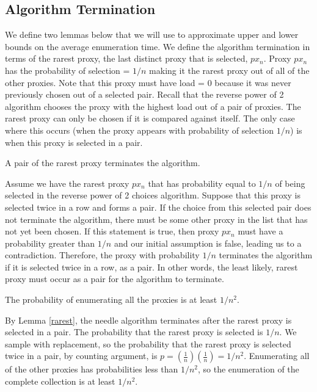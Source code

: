 \subsection{Algorithm Termination}

We define two lemmas below that we will use to approximate upper and lower bounds on the average enumeration time. We define the algorithm termination in terms of the rarest proxy, the last distinct proxy that is selected, $px_n$. Proxy $px_n$ has the probability of selection = $1/n$ making it the rarest proxy out of all of the other proxies. Note that this proxy must have load = 0 because it was never previously chosen out of a selected pair. Recall that the reverse power of 2 algorithm chooses the proxy with the highest load out of a pair of proxies. The rarest proxy can only be chosen if it is compared against itself. The only case where this occurs (when the proxy appears with probability of selection $1/n$) is when this proxy is selected in a pair. 

\begin{lemma}{A pair of the rarest proxy terminates the algorithm.}
\label{rarest}

Assume we have the rarest proxy \textbf{$px_n$} that has probability equal to $1/n$ of being selected in the reverse power of 2 choices algorithm. Suppose that this proxy is selected twice in a row and forms a pair. If the choice from this selected pair does not terminate the algorithm, there must be some other proxy in the list that has not yet been chosen. If this statement is true, then proxy \textbf{$px_n$} must have a probability greater than $1/n$ and our initial assumption is false, leading us to a contradiction. Therefore, the proxy with probability $1/n$ terminates the algorithm if it is selected twice in a row, as a pair. In other words, the least likely, rarest proxy must occur as a pair for the algorithm to terminate. 
\end{lemma}

\begin{lemma}{The probability of enumerating all the proxies is at least $1/n^2$.}

By Lemma \ref{rarest}, the needle algorithm terminates after the rarest proxy is selected in a pair. The probability that the rarest proxy is selected is $1/n$. We sample with replacement, so the probability that the rarest proxy is selected twice in a pair, by counting argument, is $p=(\frac{1}{n})(\frac{1}{n}) = 1/n^2$. Enumerating all of the other proxies has probabilities less than $1/n^2$, so the enumeration of the complete collection is at least $1/n^2$.
\end{lemma}

